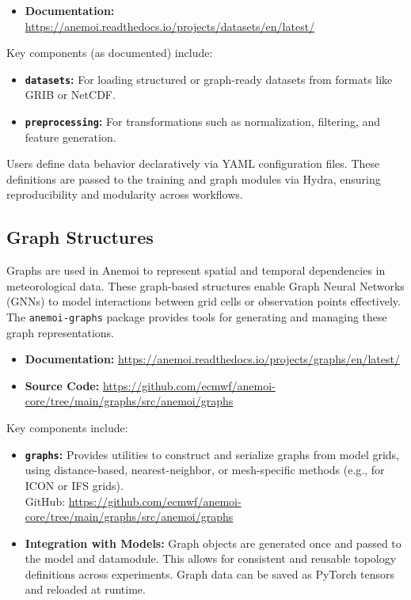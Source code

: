\begin{itemize}
  \item {\bf Documentation:} \url{https://anemoi.readthedocs.io/projects/datasets/en/latest/}
\end{itemize}

Key components (as documented) include:

\begin{itemize}
  \item {\bf \texttt{datasets}:} For loading structured or graph-ready datasets from formats like GRIB or NetCDF.
  \item {\bf \texttt{preprocessing}:} For transformations such as normalization, filtering, and feature generation.
\end{itemize}

Users define data behavior declaratively via YAML configuration files. These definitions are passed to the training and graph modules via Hydra, ensuring reproducibility and modularity across workflows.


%
\subsection{Graph Structures}

Graphs are used in Anemoi to represent spatial and temporal dependencies in meteorological data. These graph-based structures enable Graph Neural Networks (GNNs) to model interactions between grid cells or observation points effectively. The \texttt{anemoi-graphs} package provides tools for generating and managing these graph representations.

\begin{itemize}
  \item {\bf Documentation:} \url{https://anemoi.readthedocs.io/projects/graphs/en/latest/}
  \item {\bf Source Code:} \url{https://github.com/ecmwf/anemoi-core/tree/main/graphs/src/anemoi/graphs}
\end{itemize}

Key components include:

\begin{itemize}
  \item {\bf \texttt{graphs}:} Provides utilities to construct and serialize graphs from model grids, using distance-based, nearest-neighbor, or mesh-specific methods (e.g., for ICON or IFS grids).\\
  GitHub: \url{https://github.com/ecmwf/anemoi-core/tree/main/graphs/src/anemoi/graphs}
  
  \item {\bf Integration with Models:} Graph objects are generated once and passed to the model and datamodule. This allows for consistent and reusable topology definitions across experiments. Graph data can be saved as PyTorch tensors and reloaded at runtime.
\end{itemize}

